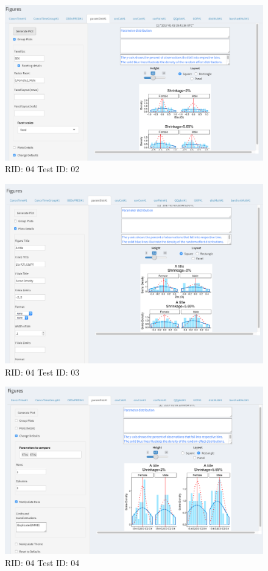 \begin{figure}[H]
\includegraphics[width=.8\textwidth]{screencaps/04-02-1.png}
\caption{RID: 04 Test ID: 02}
\end{figure}
\begin{figure}[H]
\includegraphics[width=.8\textwidth]{screencaps/04-03-1.png}
\caption{RID: 04 Test ID: 03}
\end{figure}
\begin{figure}[H]
\includegraphics[width=.8\textwidth]{screencaps/04-04-1.png}
\caption{RID: 04 Test ID: 04}
\end{figure}
